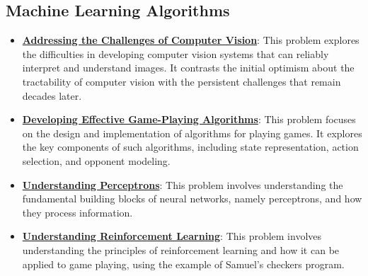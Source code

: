 \documentclass{article}%
\begin{document}
\subsection{Machine Learning Algorithms}%
\label{subsec:MachineLearningAlgorithms}%
\begin{itemize}[leftmargin=*]%
\item \href{https://purdue.brightspace.com/d2l/common/assets/pdfjs-d2l-dist/1.0.14-legacy/web/viewer.html?file=%2Fcontent%2Fenforced%2F1095467-wl.202510.CS.24300.001%2F02L2-Intro.pdf%3Fou%3D1095467&lang=en-us&container=d2l-fileviewer-rendered-pdf&fullscreen=d2l-fileviewer-rendered-pdf-dialog&height=667#page=15}{\textbf{Addressing the Challenges of Computer Vision}}: This problem explores the difficulties in developing computer vision systems that can reliably interpret and understand images. It contrasts the initial optimism about the tractability of computer vision with the persistent challenges that remain decades later.%
\item \href{https://purdue.brightspace.com/d2l/common/assets/pdfjs-d2l-dist/1.0.14-legacy/web/viewer.html?file=%2Fcontent%2Fenforced%2F1095467-wl.202510.CS.24300.001%2F02L2-Intro.pdf%3Fou%3D1095467&lang=en-us&container=d2l-fileviewer-rendered-pdf&fullscreen=d2l-fileviewer-rendered-pdf-dialog&height=667#page=22}{\textbf{Developing Effective Game-Playing Algorithms}}: This problem focuses on the design and implementation of algorithms for playing games. It explores the key components of such algorithms, including state representation, action selection, and opponent modeling.%
\item \href{https://purdue.brightspace.com/d2l/common/assets/pdfjs-d2l-dist/1.0.14-legacy/web/viewer.html?file=%2Fcontent%2Fenforced%2F1095467-wl.202510.CS.24300.001%2F02L2-Intro.pdf%3Fou%3D1095467&lang=en-us&container=d2l-fileviewer-rendered-pdf&fullscreen=d2l-fileviewer-rendered-pdf-dialog&height=667#page=45}{\textbf{Understanding Perceptrons}}: This problem involves understanding the fundamental building blocks of neural networks, namely perceptrons, and how they process information.%
\item \href{https://purdue.brightspace.com/d2l/common/assets/pdfjs-d2l-dist/1.0.14-legacy/web/viewer.html?file=%2Fcontent%2Fenforced%2F1095467-wl.202510.CS.24300.001%2F02L2-Intro.pdf%3Fou%3D1095467&lang=en-us&container=d2l-fileviewer-rendered-pdf&fullscreen=d2l-fileviewer-rendered-pdf-dialog&height=667#page=46}{\textbf{Understanding Reinforcement Learning}}: This problem involves understanding the principles of reinforcement learning and how it can be applied to game playing, using the example of Samuel's checkers program.%

\end{itemize}
\end{document}
